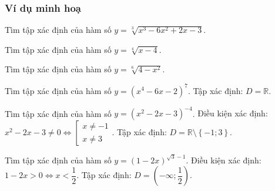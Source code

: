 \subsubsection{Ví dụ minh hoạ}
\begin{vd}%
	Tìm tập xác định của hàm số $y=\sqrt[3]{x^3-6x^2+2x-3}$.
\end{vd}
\begin{vd}%
	Tìm tập xác định của hàm số $y=\sqrt[4]{x-4}$.\dapso{$D=\left[4; +\infty\right)$.}
	\loigiai{
		Điều kiện xác định: $x-4\geq 0 \iff x\geq 4$. Tập xác định: $D=\left[4; +\infty\right)$.}
\end{vd}
\begin{vd}%
	Tìm tập xác định của hàm số $y=\sqrt[6]{4-x^2}$.
\end{vd}
\begin{vd}%
	Tìm tập xác định của hàm số $y=\left(x^4-6 x-2\right)^{7}$.
	\loigiai
	{Tập xác định: $D=\mathbb{R}$.}
\end{vd}
\begin{vd}%
	Tìm tập xác định của hàm số $y=\left(x^2-2 x-3\right)^{-4}$.
	\loigiai
	{Điều kiện xác định: $x^2-2x-3\neq 0 \iff \left[\begin{array}{l} x\neq -1\\x\neq 3 \end{array}\right.$. Tập xác định: $D=\mathbb{R}\setminus \left\{-1; 3\right\}$.}
\end{vd}
\begin{vd}%
	Tìm tập xác định của hàm số $y=(1-2 x)^{\sqrt{3}-1}$.
	\loigiai
	{Điều kiện xác định: $1-2x>0\iff x<\dfrac12$. Tập xác định: $D=\left(-\infty; \dfrac12\right)$.}
\end{vd}
